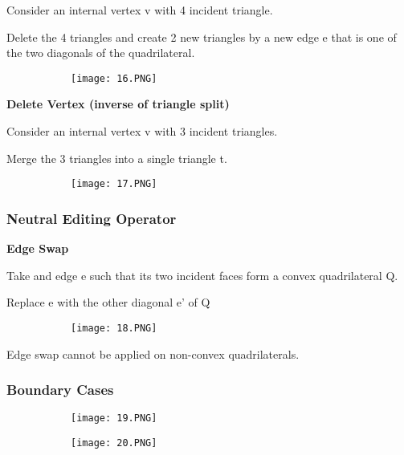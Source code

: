 \documentclass{article}
\begin{document}
Consider an internal vertex v with 4 incident triangle.

Delete the 4 triangles and create 2 new triangles by a new edge e that is one of the two diagonals of the quadrilateral.

\begin{figure}[ht!]
  \centering
  \begin{subfigure}[b]{0.4\linewidth}
    \texttt{[image: 16.PNG]}
  \end{subfigure}
\end{figure}

\textbf{Delete Vertex (inverse of triangle split)}

Consider an internal vertex v with 3 incident triangles.

Merge the 3 triangles into a single triangle t.

\begin{figure}[ht!]
  \centering
  \begin{subfigure}[b]{0.4\linewidth}
    \texttt{[image: 17.PNG]}
  \end{subfigure}
\end{figure}

\subsubsection{Neutral Editing Operator}

\textbf{Edge Swap}

Take and edge e such that its two incident faces form a convex quadrilateral Q.

Replace e with the other diagonal e' of Q

\begin{figure}[ht!]
  \centering
  \begin{subfigure}[b]{0.4\linewidth}
    \texttt{[image: 18.PNG]}
  \end{subfigure}
\end{figure}

Edge swap cannot be applied on non-convex quadrilaterals.

\vspace{20mm}

\subsubsection{Boundary Cases}

\begin{figure}[ht!]
  \centering
  \begin{subfigure}[b]{0.5\linewidth}
    \texttt{[image: 19.PNG]}
  \end{subfigure}
     \begin{subfigure}[b]{0.49\textwidth}
         \centering
         \texttt{[image: 20.PNG]}
     \end{subfigure}
\end{figure}
\end{document}
